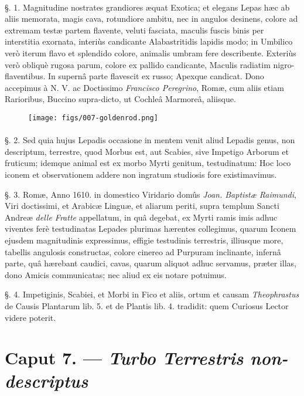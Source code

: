 \documentclass[a4paper, 11pt, oneside, polutonikogreek, german]{article}
\begin{document}
\paragraph{}
§. 1. Magnitudine nostrates grandiores æquat Exotica; et elegans Lepas hæc ab aliis memorata, magis cava, rotundiore ambitu, nec in angulos desinens, colore ad extremam testæ partem flavente, veluti fasciata, maculis fuscis binis per interstitia exornata, interiùs candicante Alabastritidis lapidis modo; in Umbilico verò iterum flavo et splendido colore, animalis umbram fere describente. Exteriùs verò obliquè rugosa parum, colore ex pallido candicante, Maculis radiatim nigro-flaventibus. In supernâ parte flavescit ex russo; Apexque candicat. Dono accepimus à N. V. ac Doctissimo \emph{Francisco Peregrino}, Romæ, cum aliis etiam Rarioribus, Buccino supra-dicto, ut Cochleâ Marmoreâ, aliisque.

\begin{figure}[H]
\centering
\texttt{[image: figs/007-goldenrod.png]}

\end{figure}
\paragraph{}
§. 2. Sed quia hujus Lepadis occasione in mentem venit aliud Lepadis genus, non descriptum, terrestre, quod Morbus est, aut Scabies, sive Impetigo Arborum et fruticum; idemque animal est ex morbo Myrti genitum, testudinatum: Hoc loco iconem et observationem addere non ingratum studiosis fore existimavimus.

§. 3. Romæ, Anno 1610. in domestico Viridario domûs \emph{Joan. Baptistæ Raimundi}, Viri doctissimi, et Arabicæ Linguæ, et aliarum periti, supra templum Sancti Andreæ \emph{delle Fratte} appellatum, in quâ degebat, ex Myrti ramis imis adhuc viventes ferè testudinatas Lepades plurimas hærentes collegimus, quarum Iconem ejusdem magnitudinis expressimus, effigie testudinis terrestris, illiusque more, tabellis angulosis constructas, colore cinereo ad Purpuram inclinante, infernâ parte, quâ hærebant caudici, cavas, quarum aliquot adhuc servamus, præter illas, dono Amicis communicatas; nec aliud ex eis notare potuimus.

§. 4. Impetiginis, Scabiei, et Morbi in Fico et aliis, ortum et causam \emph{Theophrastus} de Causis Plantarum lib. 5. et de Plantis lib. 4. tradidit: quem Curiosus Lector videre poterit.

\section{Caput 7. --- \emph{Turbo Terrestris non-descriptus}}
\end{document}

